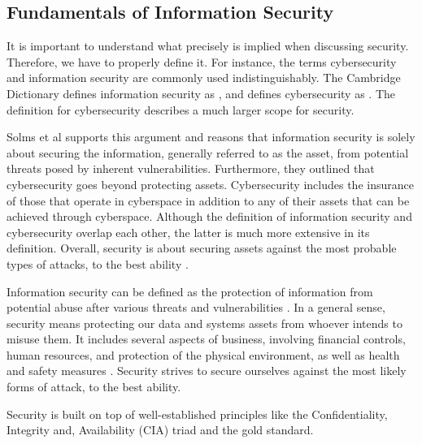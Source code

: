 \subsection{Fundamentals of Information Security}
It is important to understand what precisely is implied when discussing security. Therefore, we have to properly define it. For instance, the terms cybersecurity and information security are commonly used indistinguishably. The Cambridge Dictionary defines information security as , and defines cybersecurity as . The definition for cybersecurity describes a much larger scope for security. 

Solms et al \cite{von_Solms_2013} supports this argument and reasons that information security is solely about securing the information, generally referred to as the asset, from potential threats posed by inherent vulnerabilities. Furthermore, they outlined that cybersecurity goes beyond protecting assets. Cybersecurity includes the insurance of those that operate in cyberspace in addition to any of their assets that can be achieved through cyberspace. Although the definition of information security and cybersecurity overlap each other, the latter is much more extensive in its definition. Overall, security is about securing assets against the most probable types of attacks, to the best ability \cite{andress2014the}.

Information security can be defined as the protection of information from potential abuse after various threats and vulnerabilities \cite{von_Solms_2013}. In a general sense, security means protecting our data and systems assets from whoever intends to misuse them. It includes several aspects of business, involving financial controls, human resources, and protection of the physical environment, as well as health and safety measures \cite{zinatullin2016the}. Security strives to secure ourselves against the most likely forms of attack, to the best ability.

Security is built on top of well-established principles like the Confidentiality, Integrity and, Availability (CIA) triad and the gold standard.

